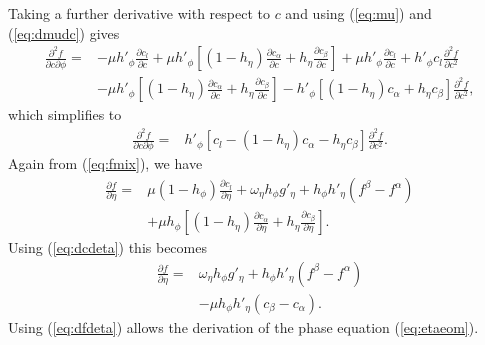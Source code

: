 Taking a further derivative with respect to $c$ and using
(\ref{eq:mu}) and (\ref{eq:dmudc}) gives
%
\begin{equation}
\begin{split}
  \frac{\partial^2 f}{\partial c \partial \phi} = {}
  & - \mu h'_\phi \frac{\partial c_l}{\partial c}
    + \mu h'_\phi \left[
    ( 1 - h_\eta ) \frac{\partial c_\alpha}{\partial c}
    + h_\eta \frac{\partial c_\beta}{\partial c} \right]
    + \mu h'_\phi \frac{\partial c_l}{\partial c}
    + h'_\phi c_l \frac{\partial^2 f}{\partial c^2}
  \\ & - \mu h'_\phi \left[
    ( 1 - h_\eta ) \frac{\partial c_\alpha}{\partial c}
    + h_\eta \frac{\partial c_\beta}{\partial c} \right]
    - h'_\phi \left[
    ( 1 - h_\eta ) c_\alpha + h_\eta c_\beta \right]
    \frac{\partial^2 f}{\partial c^2},
\end{split}
\end{equation}
%
which simplifies to
%
\begin{equation}
\begin{split}
  \frac{\partial^2 f}{\partial c \partial \phi} = {}
  & h'_\phi \left[ c_l - ( 1 - h_\eta ) c_\alpha
    - h_\eta c_\beta \right]
    \frac{\partial^2 f}{\partial c^2}.
\label{eq:dfdcdphi}
\end{split}
\end{equation}
%
Again from (\ref{eq:fmix}), we have
%
\begin{equation}
\begin{split}
  \frac{\partial f}{\partial\eta} = {}
  & \mu ( 1 - h_\phi ) \frac{\partial c_l}{\partial \eta}
    + \omega_\eta h_\phi g'_\eta
    + h_\phi h'_\eta ( f^\beta - f^\alpha )
  \\ & + \mu h_\phi \left[
    ( 1 - h_\eta ) \frac{\partial c_\alpha}{\partial \eta}
    + h_\eta \frac{\partial c_\beta}{\partial \eta} \right].
\end{split}
\end{equation}
%
Using (\ref{eq:dcdeta}) this becomes
%
\begin{equation}
\begin{split}
  \frac{\partial f}{\partial\eta} = {}
  & \omega_\eta h_\phi g'_\eta
    + h_\phi h'_\eta ( f^\beta - f^\alpha )
  \\ & - \mu h_\phi h'_\eta ( c_\beta - c_\alpha ).
\label{eq:dfdeta}
\end{split}
\end{equation}
%
Using (\ref{eq:dfdeta}) allows the derivation of the phase equation
(\ref{eq:etaeom}).

